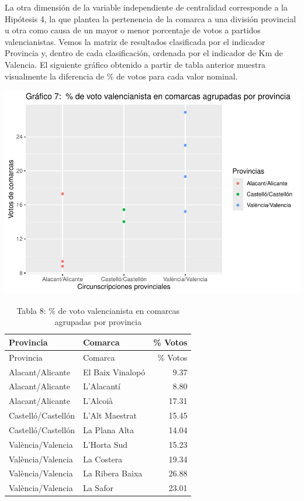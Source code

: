 \documentclass[
]{article}
\begin{document}
La otra dimensión de la variable independiente de centralidad
corresponde a la Hipótesis 4, la que plantea la pertenencia de la
comarca a una división provincial u otra como causa de un mayor o menor
porcentaje de votos a partidos valencianistas. Vemos la matriz de
resultados clasificada por el indicador Provincia y, dentro de cada
clasificación, ordenada por el indicador de Km de Valencia. El siguiente
gráfico obtenido a partir de tabla anterior muestra visualmente la
diferencia de \% de votos para cada valor nominal.

\includegraphics[width=0.8\linewidth,height=0.8\textheight]{votovalencianista-ea2023_files/figure-latex/funcionesGrafico2-1}

\begin{longtable}[]{@{}llr@{}}
\caption{Tabla 8: \% de voto valencianista en comarcas agrupadas por
provincia}\tabularnewline
\toprule\noalign{}
Provincia & Comarca & \% Votos \\
\midrule\noalign{}
\endfirsthead
\toprule\noalign{}
Provincia & Comarca & \% Votos \\
\midrule\noalign{}
\endhead
\bottomrule\noalign{}
\endlastfoot
Alacant/Alicante & El Baix Vinalopó & 9.37 \\
Alacant/Alicante & L'Alacantí & 8.80 \\
Alacant/Alicante & L'Alcoià & 17.31 \\
Castelló/Castellón & L'Alt Maestrat & 15.45 \\
Castelló/Castellón & La Plana Alta & 14.04 \\
València/Valencia & L'Horta Sud & 15.23 \\
València/Valencia & La Costera & 19.34 \\
València/Valencia & La Ribera Baixa & 26.88 \\
València/Valencia & La Safor & 23.01 \\
\end{longtable}
\end{document}
